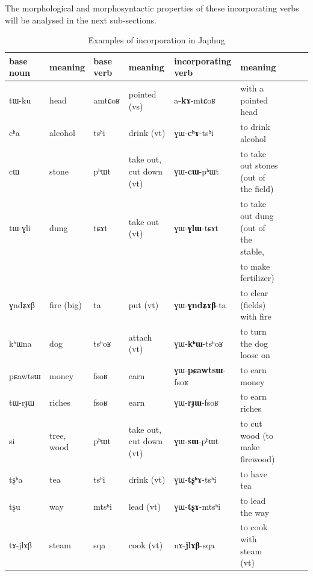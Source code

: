 \documentclass[oldfontcommands,oneside,a4paper,11pt]{article}
\newcommand{\ipa}[1]{{\phon #1}} %
\begin{document}
The morphological and morphosyntactic properties of these incorporating verbs will be analysed in the next sub-sections.
  \begin{landscape}
  
  \begin{table}[h]
  \caption{Examples of incorporation in Japhug}\label{tab:incorp.japhug}
\begin{tabular}{lllllllll}

   \toprule
base noun & meaning & base verb & meaning & incorporating verb & meaning \\
\midrule
 \ipa{tɯ-ku} & head & \ipa{amtɕoʁ} & pointed (vs)& \ipa{a-\textbf{kɤ}-mtɕoʁ} & with a pointed head \\
 \ipa{cʰa} & alcohol & \ipa{tsʰi} & drink (vt)& \ipa{ɣɯ-\textbf{cʰɤ}-tsʰi } & to drink alcohol\\
  \ipa{cɯ} & stone & \ipa{pʰɯt} & take out, cut down (vt) & \ipa{ ɣɯ-\textbf{cɯ}-pʰɯt } & to take out stones (out of the field)\\
   \ipa{tɯ-ɣli} & dung & \ipa{tɕɤt} & take out (vt)& \ipa{ɣɯ-\textbf{ɣlɯ}-tɕɤt} & to take out dung (out of the stable, \\
   &&&&&    to make fertilizer)\\
   
  \ipa{ɣndʑɤβ} & fire (big) & \ipa{ta} & put (vt)& \ipa{ɣɯ-\textbf{ɣndʑɤβ}-ta} & to clear (fields) with fire  \\
  \ipa{kʰɯna} & dog & \ipa{tsʰoʁ} & attach (vt) & \ipa{ɣɯ-\textbf{kʰɯ}-tsʰoʁ} & to turn the dog loose on   \\
  \ipa{pɕawtsɯ} & money & \ipa{fsoʁ} & earn & \ipa{ɣɯ-\textbf{pɕawtsɯ}-fsoʁ} & to earn money  \\
    \ipa{tɯ-rɟɯ} & riches & \ipa{fsoʁ} & earn & \ipa{ɣɯ-\textbf{rɟɯ}-fsoʁ} & to earn riches  \\
  \ipa{si} & tree, wood & \ipa{pʰɯt} & take out, cut down (vt) &   \ipa{ɣɯ-\textbf{sɯ}-pʰɯt} & to cut wood (to make firewood) \\
  \ipa{tʂʰa} & tea & \ipa{tsʰi} & drink (vt)& \ipa{ɣɯ-\textbf{tʂʰɤ}-tsʰi} & to have tea  \\
  \ipa{tʂu} & way & \ipa{mtsʰi} & lead (vt)& \ipa{ɣɯ-\textbf{tʂɤ}-mtsʰi} & to lead the way  \\
  \ipa{tɤ-jlɤβ} & steam & \ipa{sqa} & cook (vt) & \ipa{nɤ-\textbf{jlɤβ}-sqa} & to cook with steam  (vt) \\
  

\end{tabular}
\end{table}
\end{landscape}
\end{document}
